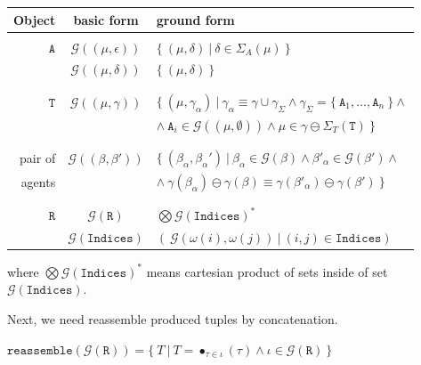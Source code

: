 \documentclass[12pt]{fithesis2}
\begin{document}
\begin{center}
\begin{tabular}{ r c l }
Object & basic form & ground form \\
\hline
 & & \\
$\mathtt{A}$ & $\mathcal{G}((\mu, \epsilon))$ & $\{~ (\mu, \delta) ~|~ \delta \in \Sigma_A(\mu) ~\}$\\
 & $\mathcal{G}((\mu, \delta))$ & $\{~(\mu, \delta) ~\}$\\
 & & \\
 \hline
 & & \\
$\mathtt{T}$ & $\mathcal{G}((\mu, \gamma))$ & $\{~ (\mu, \gamma_\alpha) ~|~ \gamma_\alpha \equiv \gamma \cup \gamma_\Sigma \wedge \gamma_\Sigma = \{~ \mathtt{A}_1, \ldots, \mathtt{A}_n ~\} \wedge$\\
 & & $\wedge~ \mathtt{A}_i \in \mathcal{G}((\mu, \emptyset)) \wedge \mu \in \gamma \ominus \Sigma_T(\mathtt{T}) ~\}$ \\
 & & \\
 \hline
 & & \\
pair of & $\mathcal{G}((\beta, \beta'))$ & $\{~ (\beta_\alpha, \beta_\alpha') ~|~ \beta_\alpha \in \mathcal{G}(\beta) \wedge \beta'_\alpha \in \mathcal{G}(\beta') \wedge$\\
agents & & $\wedge~ \gamma(\beta_\alpha) \ominus \gamma(\beta) \equiv \gamma(\beta'_\alpha) \ominus \gamma(\beta') ~\} $ \\
 & & \\
 \hline
 & & \\
$\mathtt{R}$ & $\mathcal{G}(\mathtt{R})$ & $ \bigotimes \mathcal{G}(\mathtt{Indices})^* $ \\
 & $\mathcal{G}(\mathtt{Indices})$ & $(~\mathcal{G}(\omega(i), \omega(j)) ~|~ (i,j) \in \mathtt{Indices})$\\
 
\end{tabular}
\end{center}

where $\bigotimes \mathcal{G}(\mathtt{Indices})^*$ means cartesian product of sets inside of set $\mathcal{G}(\mathtt{Indices})$.

\noindent Next, we need reassemble produced tuples by concatenation.

\begin{center}
$\mathtt{reassemble}(\mathcal{G}(\mathtt{R})) = \{~  T ~|~ T = \bullet_{\tau \in \iota} (\tau) \wedge \iota \in \mathcal{G}(\mathtt{R}) ~\}$
\end{center}
\end{document}
